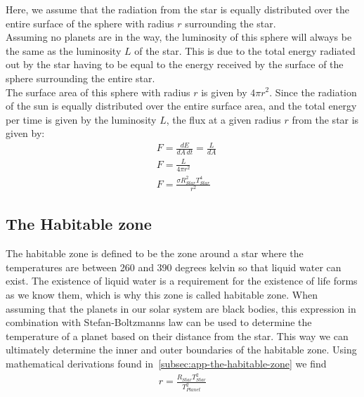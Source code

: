 \documentclass[reprint,english,notitlepage]{revtex4-2}
\begin{document}
Here, we assume that the radiation from the star is equally distributed over the entire surface of the sphere with radius $r$ surrounding the star.\\
Assuming no planets are in the way, the luminosity of this sphere will always be the same as the luminosity $L$ of the star.
This is due to the total energy radiated out by the star having to be equal to the energy received by the surface of the sphere surrounding the entire star.\\
The surface area of this sphere with radius $r$ is given by $4 \pi r^2$.
Since the radiation of the sun is equally distributed over the entire surface area, and the total energy per time is given by the luminosity $L$, the flux at a given radius $r$ from the star is given by:
\begin{align}
    &F = \frac{dE}{dA \, dt} = \frac{L}{dA}\\
	&F = \frac{L}{4 \pi r^2}\\
	&F = \frac{\sigma R_{Star}^2 T_{Star}^4}{r^2} \label{Flux_Distance}
\end{align}

\subsection{The Habitable zone}\label{subsec:temperature-of-planets}
The habitable zone is defined to be the zone around a star where the temperatures are between 260 and 390 degrees kelvin so that liquid water can exist.
The existence of liquid water is a requirement for the existence of life forms as we know them, which is why this zone is called habitable zone.
When assuming that the planets in our solar system are black bodies, this expression in combination with Stefan-Boltzmanns law can be used to determine the temperature of a planet based on their distance from the star.
This way we can ultimately determine the inner and outer boundaries of the habitable zone.
Using mathematical derivations found in~\ref{subsec:app-the-habitable-zone} we find
\begin{align}
	r = \frac{R_{Star} T_{Star}^2}{T_{Planet}^2} \label{Radius_temp}
\end{align}
\end{document}
